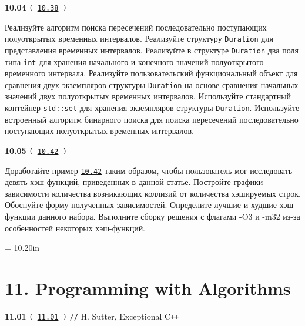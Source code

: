 \documentclass[a4paper,12pt]{article}
\begin{document}
\bigskip

{\large \textbf{10.04} \texttt{(\,\href{https://github.com/i-s-m-mipt/Education/blob/master/projects/examples/source/10.38.cpp}{10.38}\,)}}

\bigskip

Реализуйте алгоритм поиска пересечений последовательно поступающих полуоткрытых временных интервалов. Реализуйте структуру \lstinline{Duration} для представления временных интервалов. Реализуйте в структуре \lstinline{Duration} два поля типа \lstinline{int} для хранения начального и конечного значений полуоткрытого временного интервала. Реализуйте пользовательский функциональный объект для сравнения двух экземпляров структуры \lstinline{Duration} на основе сравнения начальных значений двух полуоткрытых временных интервалов. Используйте стандартный контейнер \lstinline{std::set} для хранения экземпляров структуры \lstinline{Duration}. Используйте встроенный алгоритм бинарного поиска для поиска пересечений последовательно поступающих полуоткрытых временных интервалов.

\bigskip

{\large \textbf{10.05} \texttt{(\,\href{https://github.com/i-s-m-mipt/Education/blob/master/projects/examples/source/10.42.cpp}{10.42}\,)}}

\bigskip

Доработайте пример \href{https://github.com/i-s-m-mipt/Education/blob/master/projects/examples/source/10.42.cpp}{\texttt{10.42}} таким образом, чтобы пользователь мог исследовать девять хэш-функций, приведенных в данной \href{https://www.partow.net/programming/hashfunctions/#AvailableHashFunctions}{статье}. Постройте графики зависимости количества возникающих коллизий от количества хэшируемых строк. Обоснуйте форму полученных зависимостей. Определите лучшие и худшие хэш-функции данного набора. Выполните сборку решения с флагами -O3 и -m32 из-за особенностей некоторых хэш-функций.



\newpage\thispagestyle{empty}\pdfpageheight = 10.20in\enlargethispage{100in}

\section{11. Programming with Algorithms}

{\large \textbf{11.01} \texttt{(\,\href{https://github.com/i-s-m-mipt/Education/blob/master/projects/examples/source/11.01.cpp}{11.01}\,)} \texttt{//} H. Sutter, Exceptional C\texttt{++}}
\end{document}
